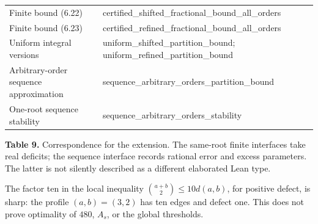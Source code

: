 \documentclass[english,11pt,a4paper]{article}
\begin{document}
{\begin{longtable}[c]{@{}
  >{\raggedright\arraybackslash}p{}
  >{\raggedright\arraybackslash}p{}@{}}
Finite bound (6.22) & {\ttfamily\small certified\_\discretionary{\hbox{\ensuremath{\hookrightarrow}}}{}{}shifted\_\discretionary{\hbox{\ensuremath{\hookrightarrow}}}{}{}fractional\_\discretionary{\hbox{\ensuremath{\hookrightarrow}}}{}{}bound\_\discretionary{\hbox{\ensuremath{\hookrightarrow}}}{}{}all\_\discretionary{\hbox{\ensuremath{\hookrightarrow}}}{}{}orders} \\
Finite bound (6.23) & {\ttfamily\small certified\_\discretionary{\hbox{\ensuremath{\hookrightarrow}}}{}{}refined\_\discretionary{\hbox{\ensuremath{\hookrightarrow}}}{}{}fractional\_\discretionary{\hbox{\ensuremath{\hookrightarrow}}}{}{}bound\_\discretionary{\hbox{\ensuremath{\hookrightarrow}}}{}{}all\_\discretionary{\hbox{\ensuremath{\hookrightarrow}}}{}{}orders} \\
Uniform integral versions & {\ttfamily\small uniform\_\discretionary{\hbox{\ensuremath{\hookrightarrow}}}{}{}shifted\_\discretionary{\hbox{\ensuremath{\hookrightarrow}}}{}{}partition\_\discretionary{\hbox{\ensuremath{\hookrightarrow}}}{}{}bound}; {\ttfamily\small uniform\_\discretionary{\hbox{\ensuremath{\hookrightarrow}}}{}{}refined\_\discretionary{\hbox{\ensuremath{\hookrightarrow}}}{}{}partition\_\discretionary{\hbox{\ensuremath{\hookrightarrow}}}{}{}bound} \\
Arbitrary-order sequence approximation & {\ttfamily\small sequence\_\discretionary{\hbox{\ensuremath{\hookrightarrow}}}{}{}arbitrary\_\discretionary{\hbox{\ensuremath{\hookrightarrow}}}{}{}orders\_\discretionary{\hbox{\ensuremath{\hookrightarrow}}}{}{}partition\_\discretionary{\hbox{\ensuremath{\hookrightarrow}}}{}{}bound} \\
One-root sequence stability & {\ttfamily\small sequence\_\discretionary{\hbox{\ensuremath{\hookrightarrow}}}{}{}arbitrary\_\discretionary{\hbox{\ensuremath{\hookrightarrow}}}{}{}orders\_\discretionary{\hbox{\ensuremath{\hookrightarrow}}}{}{}stability} \\
\end{longtable}
}

\textbf{Table 9.} Correspondence for the extension. The same-root finite interfaces take real deficits; the sequence interface records rational error and excess parameters. The latter is not silently described as a different elaborated Lean type.

The factor ten in the local inequality \(\binom{a+b}{2}\le10d(a,b)\), for positive defect, is sharp: the profile \((a,b)=(3,2)\) has ten edges and defect one. This does not prove optimality of \(480\), \(A_s\), or the global thresholds.
\end{document}
